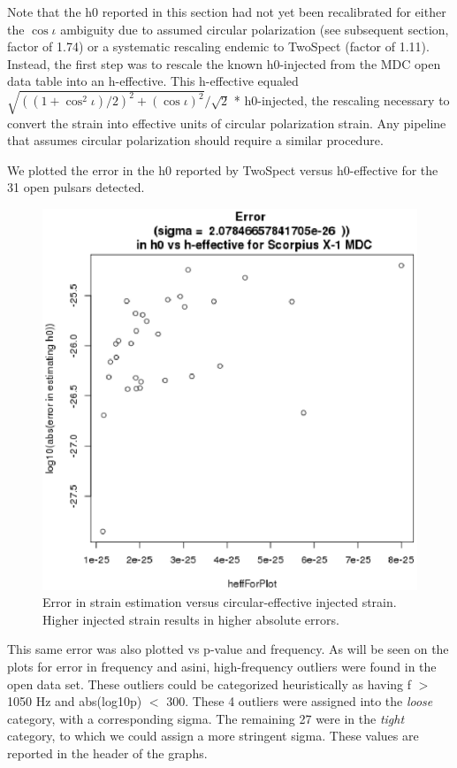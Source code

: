 Note that the h0 reported in this section had not yet been recalibrated for either the $\cos \iota$ ambiguity due to assumed circular polarization (see subsequent section, factor of 1.74) or a systematic rescaling endemic to TwoSpect (factor of 1.11). Instead, the first step was to rescale the known h0-injected from the MDC open data table into an h-effective. This h-effective equaled $\sqrt{ ((1+\cos^2 \iota) / 2)^2 + (\cos \iota)^2 }/\sqrt{2}$ * h0-injected, the rescaling necessary to convert the strain into effective units of circular polarization strain. Any pipeline that assumes circular polarization should require a similar procedure.

We plotted the error in the h0 reported by TwoSpect versus h0-effective for the 31 open pulsars detected.


\begin{figure}
\begin{center}
\includegraphics[width=0.3\paperwidth,height=0.2\paperheight]{detectedHerrVsHeffective.eps}
\caption{ Error in strain estimation versus circular-effective injected strain. Higher injected strain results in higher absolute errors.
} 
\end{center}
\end{figure}


This same error was also plotted vs p-value and frequency. As will be seen on the plots for error in frequency and asini, high-frequency outliers were found in the open data set. These outliers could be categorized heuristically as having f $>$ 1050 Hz and abs(log10p) $<$ 300. These 4 outliers were assigned into the \textit{loose} category, with a corresponding sigma. The remaining 27 were in the \textit{tight} category, to which we could assign a more stringent sigma. These values are reported in the header of the graphs.

